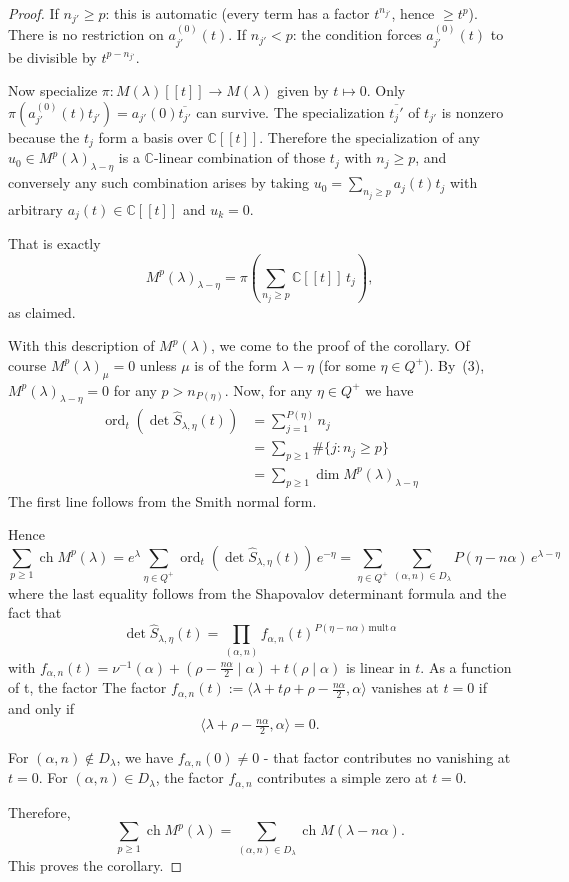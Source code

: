 \documentclass[12pt]{article}
\begin{document}
\begin{proof}
If $n_{j'}\geq p$: this is automatic (every term has a factor $t^{n_{j'}}$, hence $\geq t^p$). There is no restriction on $a_{j'}^{(0)}(t)$. If $n_{j'} < p$: the condition forces $a_{j'}^{(0)}(t)$ to be divisible by $t^{p-n_{j'}}$.

Now specialize $\pi: M(\lambda)[[t]]\to M(\lambda)$ given by $t\mapsto 0$. Only $\pi(a_{j'}^{(0)}(t)t_{j'})=a_{j'}(0)\overline{t_{j'}}$ can survive. The specialization $\overline{t_j'}$ of $t_{j'}$ is nonzero because the $t_j$ form a basis over $\mathbb{C}[[t]]$. Therefore the specialization of any $u_0\in M^p(\lambda)_{\lambda-\eta}$ is a $\mathbb{C}$-linear combination of those $t_j$ with $n_j\geq p$, and conversely any such combination arises by taking $u_0=\sum_{n_j\geq p} a_j(t)t_j$ with arbitrary $a_j(t)\in\mathbb{C}[[t]]$ and $u_k=0$.

That is exactly
\[M^p(\lambda)_{\lambda-\eta} = \pi\!\left(\sum_{n_j\geq p}\mathbb{C}[[t]]\,t_j\right),\]
as claimed.

With this description of $M^p(\lambda)$, we come to the proof of the corollary.
Of course $M^p(\lambda)_\mu = 0$ unless $\mu$ is of the form $\lambda - \eta$
(for some $\eta \in Q^+$).
By~(3), $M^p(\lambda)_{\lambda-\eta} = 0$ for any $p > n_{P(\eta)}$.
Now, for any $\eta \in Q^+$ we have
\begin{align*}
\operatorname{ord}_t(\det \widehat{S}_{\lambda,\eta}(t)) &= \sum_{j=1}^{P(\eta)} n_j \\
&= \sum_{p\ge1}\#\{j : n_j\ge p\} \\
&= \sum_{p \ge 1} \dim M^p(\lambda)_{\lambda-\eta}
\end{align*}
The first line follows from the Smith normal form.

Hence
\[
\sum_{p \ge 1} \operatorname{ch} M^p(\lambda)
= e^{\lambda}
\sum_{\eta \in Q^+}
\operatorname{ord}_t(\det \widehat{S}_{\lambda,\eta}(t))\, e^{-\eta}
= \sum_{\eta \in Q^+}
\sum_{(\alpha,n)\in D_\lambda}
P(\eta - n\alpha)\, e^{\lambda - \eta}
\]
where the last equality follows from the Shapovalov determinant formula and the fact that
\[\det\widehat S_{\lambda,\eta}(t)
=\!\!\prod_{(\alpha,n)}\!\!
f_{\alpha,n}(t)^{P(\eta-n\alpha)\,\mathrm{mult}\,\alpha}\]
with $f_{\alpha,n}(t) = \nu^{-1}(\alpha) + (\rho - \tfrac{n\alpha}{2} \mid \alpha) + t(\rho \mid \alpha)$ is linear in $t$. As a function of t, the factor
The factor $f_{\alpha,n}(t):=\langle \lambda+t\rho+\rho-\tfrac{n\alpha}{2},\alpha\rangle$ vanishes at $t=0$ if and only if
\[\langle \lambda+\rho-\tfrac{n\alpha}{2},\alpha\rangle=0.\]

For $(\alpha,n)\notin D_\lambda$, we have $f_{\alpha,n}(0)\neq0$ - that factor contributes no vanishing at $t=0$. For $(\alpha,n)\in D_\lambda$, the factor $f_{\alpha,n}$ contributes a simple zero at $t=0$.


Therefore,
\[
\sum_{p \ge 1} \operatorname{ch} M^p(\lambda)
= \sum_{(\alpha,n)\in D_\lambda}
\operatorname{ch} M(\lambda - n\alpha).
\]
This proves the corollary.
\end{proof}
\end{document}
